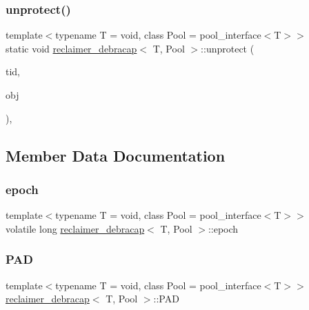 \subsubsection{\texorpdfstring{unprotect()}{unprotect()}}
{\footnotesize\ttfamily template$<$typename T  = void, class Pool  = pool\+\_\+interface$<$\+T$>$$>$ \\
static void \hyperlink{classreclaimer__debracap}{reclaimer\+\_\+debracap}$<$ T, Pool $>$\+::unprotect (\begin{DoxyParamCaption}\item[{const int}]{tid,  }\item[{T $\ast$const}]{obj }\end{DoxyParamCaption})\hspace{0.3cm}{\ttfamily [inline]}, {\ttfamily [static]}}



\subsection{Member Data Documentation}
\mbox{\label{classreclaimer__debracap_ad3bcf7f4ebbdbcab522af7f5b0447cb5}} 
\subsubsection{\texorpdfstring{epoch}{epoch}}
{\footnotesize\ttfamily template$<$typename T  = void, class Pool  = pool\+\_\+interface$<$\+T$>$$>$ \\
volatile long \hyperlink{classreclaimer__debracap}{reclaimer\+\_\+debracap}$<$ T, Pool $>$\+::epoch\hspace{0.3cm}{\ttfamily [protected]}}

\mbox{\label{classreclaimer__debracap_a558831a56d3365af4684bd49307a75cc}} 
\subsubsection{\texorpdfstring{P\+AD}{PAD}}
{\footnotesize\ttfamily template$<$typename T  = void, class Pool  = pool\+\_\+interface$<$\+T$>$$>$ \\
\hyperlink{classreclaimer__debracap}{reclaimer\+\_\+debracap}$<$ T, Pool $>$\+::P\+AD\hspace{0.3cm}{\ttfamily [protected]}}


